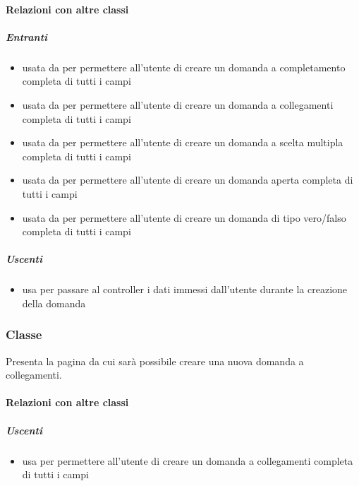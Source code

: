 \paragraph{Relazioni con altre classi}
\subparagraph{Entranti}
\begin{itemize}
\item usata da  per permettere all'utente di creare un domanda a completamento completa di tutti i campi
\item usata da  per permettere all'utente di creare un domanda a collegamenti completa di tutti i campi
\item usata da  per permettere all'utente di creare un domanda a scelta multipla completa di tutti i campi
\item usata da  per permettere all'utente di creare un domanda aperta completa di tutti i campi
\item usata da  per permettere all'utente di creare un domanda di tipo vero/falso completa di tutti i campi
\end{itemize}
\subparagraph{Uscenti}
\begin{itemize}
\item usa  per passare al controller i dati immessi dall'utente durante la creazione della domanda
\end{itemize}
\subsubsection{Classe }
Presenta la pagina da cui sarà possibile creare una nuova domanda a collegamenti.
\paragraph{Relazioni con altre classi}
\subparagraph{Uscenti}
\begin{itemize}
\item usa  per permettere all'utente di creare un domanda a collegamenti completa di tutti i campi
\end{itemize}
